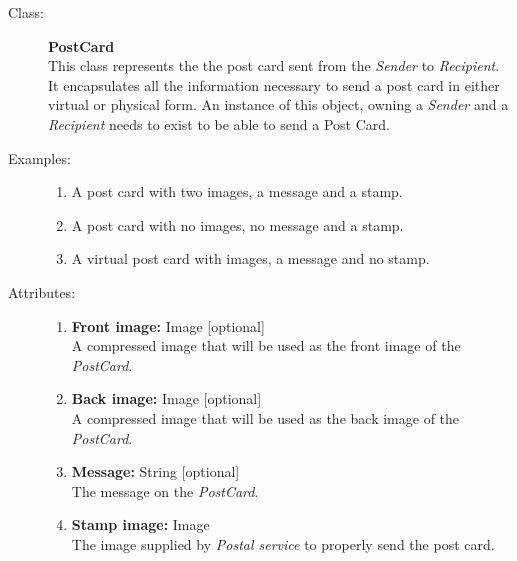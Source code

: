 \documentclass[10pt,a4paper]{article}
\begin{document}
\begin{description}
\item[Class:] \textbf{PostCard} \hfill \\
This class represents the the post card sent from the \textit{Sender} to \textit{Recipient}. It encapsulates all the information necessary to send a post card in either virtual or physical form. An instance of this object, owning a \textit{Sender} and a \textit{Recipient} needs to exist to be able to send a Post Card. 

\item[Examples:] \hfill
\begin{enumerate}
\item A post card with two images, a message and a stamp.
\item A post card with no images, no message and a stamp.
\item A virtual post card with images, a message and no stamp.
\end{enumerate}

\item[Attributes:] \hfill
\begin{enumerate}
\item \textbf{Front image:} Image [optional] \hfill \\A compressed image that will be used as the front image of the \textit{PostCard}. 
\item \textbf{Back image:} Image [optional] \hfill \\A compressed image that will be used as the back image of the \textit{PostCard}.
\item \textbf{Message:} String [optional] \hfill \\The message on the \textit{PostCard}.
\item \textbf{Stamp image:} Image \hfill \\The image supplied by \textit{Postal service} to properly send the post card.
\end{enumerate}
\end{description}

\hrulefill
\end{document}
